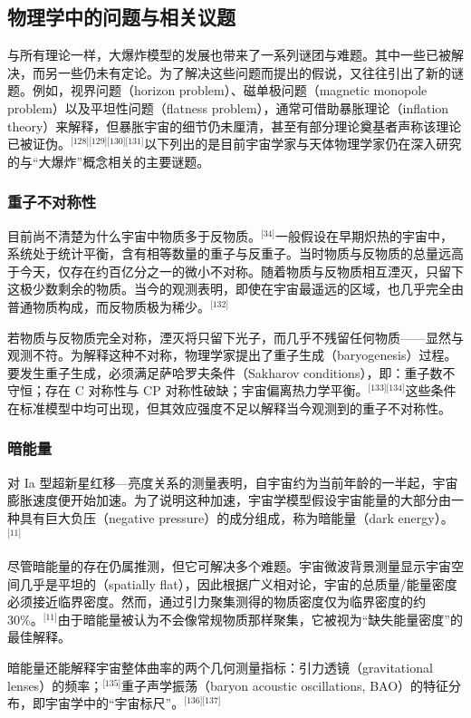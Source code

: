 \subsection{物理学中的问题与相关议题}
与所有理论一样，大爆炸模型的发展也带来了一系列谜团与难题。其中一些已被解决，而另一些仍未有定论。为了解决这些问题而提出的假说，又往往引出了新的谜题。例如，视界问题（horizon problem）、磁单极问题（magnetic monopole problem）以及平坦性问题（flatness problem），通常可借助暴胀理论（inflation theory）来解释，但暴胀宇宙的细节仍未厘清，甚至有部分理论奠基者声称该理论已被证伪。\(^\text{[128][129][130][131]}\)以下列出的是目前宇宙学家与天体物理学家仍在深入研究的与“大爆炸”概念相关的主要谜题。
\subsubsection{重子不对称性}
目前尚不清楚为什么宇宙中物质多于反物质。\(^\text{[34]}\)一般假设在早期炽热的宇宙中，系统处于统计平衡，含有相等数量的重子与反重子。当时物质与反物质的总量远高于今天，仅存在约百亿分之一的微小不对称。随着物质与反物质相互湮灭，只留下这极少数剩余的物质。当今的观测表明，即使在宇宙最遥远的区域，也几乎完全由普通物质构成，而反物质极为稀少。\(^\text{[132]}\)

若物质与反物质完全对称，湮灭将只留下光子，而几乎不残留任何物质——显然与观测不符。为解释这种不对称，物理学家提出了重子生成（baryogenesis）过程。要发生重子生成，必须满足萨哈罗夫条件（Sakharov conditions），即：重子数不守恒；存在 C 对称性与 CP 对称性破缺；宇宙偏离热力学平衡。\(^\text{[133][134]}\)这些条件在标准模型中均可出现，但其效应强度不足以解释当今观测到的重子不对称性。
\subsubsection{暗能量}
对 Ia 型超新星红移—亮度关系的测量表明，自宇宙约为当前年龄的一半起，宇宙膨胀速度便开始加速。为了说明这种加速，宇宙学模型假设宇宙能量的大部分由一种具有巨大负压（negative pressure）的成分组成，称为暗能量（dark energy）。\(^\text{[11]}\)

尽管暗能量的存在仍属推测，但它可解决多个难题。宇宙微波背景测量显示宇宙空间几乎是平坦的（spatially flat），因此根据广义相对论，宇宙的总质量/能量密度必须接近临界密度。然而，通过引力聚集测得的物质密度仅为临界密度的约 30\%。\(^\text{[11]}\)由于暗能量被认为不会像常规物质那样聚集，它被视为“缺失能量密度”的最佳解释。  

暗能量还能解释宇宙整体曲率的两个几何测量指标：引力透镜（gravitational lenses）的频率；\(^\text{[135]}\)重子声学振荡（baryon acoustic oscillations, BAO）的特征分布，即宇宙学中的“宇宙标尺”。\(^\text{[136][137]}\)

